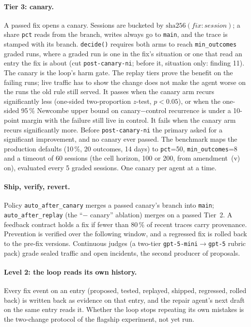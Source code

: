 \documentclass[11pt]{article}
\newcommand{\code}[1]{\texttt{#1}}
\begin{document}
\paragraph{Tier 3: canary.} A passed fix opens a canary. Sessions are bucketed by
$\mathrm{sha256}(\mathit{fix}{:}\mathit{session})$; a share \code{pct} reads from the branch,
writes always go to \code{main}, and the trace is stamped with its branch. \code{decide()}
requires both arms to reach \code{min\_outcomes} graded runs, where a graded run is one in the
fix's situation or one that read an entry the fix is about (cut \code{post-canary-ni}; before it,
situation only: finding 11). The canary is the loop's harm gate. The replay tiers prove the
benefit on the failing runs; live traffic has to show the change does not make the agent worse on
the runs the old rule still served. It passes when the canary arm recurs significantly less
(one-sided two-proportion $z$-test, $p<0.05$), or when the one-sided 95\,\% Newcombe upper bound
on canary$-$control recurrence is under a 10-point margin with the failure still live in control.
It fails when the canary arm recurs significantly more. Before \code{post-canary-ni} the primary
asked for a significant improvement, and no canary ever passed. The benchmark maps the production
defaults (10\,\%, 20 outcomes, 14 days) to \code{pct}=50, \code{min\_outcomes}=8 and a timeout
of 60 sessions (the cell horizon, 100 or 200, from amendment~(v) on), evaluated every 5 graded
sessions. One canary per agent at a time.

\paragraph{Ship, verify, revert.} Policy \code{auto\_after\_canary} merges a passed canary's
branch into \code{main}; \code{auto\_after\_replay} (the ``$-$ canary'' ablation) merges on a
passed Tier~2. A feedback contract holds a fix if fewer than 80\,\% of recent traces carry
provenance. Prevention is verified over the following window, and a regressed fix is rolled
back to the pre-fix versions. Continuous judges (a two-tier \code{gpt-5-mini}$\to$\code{gpt-5}
rubric pack) grade sealed traffic and open incidents, the second producer of proposals.

\paragraph{Level 2: the loop reads its own history.} Every fix event on an entry (proposed,
tested, replayed, shipped, regressed, rolled back) is written back as evidence on that entry,
and the repair agent's next draft on the same entry reads it. Whether the loop stops repeating
its own mistakes is the two-change protocol of the flagship experiment, not yet run.
\end{document}
